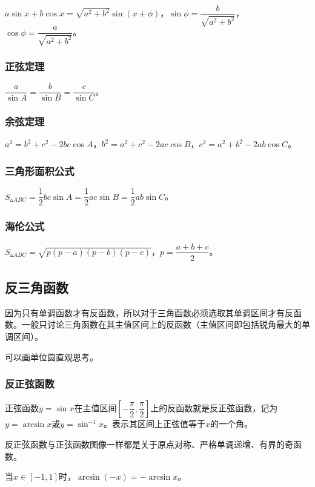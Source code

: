 $a\sin x+b\cos x=\sqrt{a^2+b^2}\sin(x+\phi)$，$\sin\phi=\dfrac{b}{\sqrt{a^2+b^2}}$，$\cos\phi=\dfrac{a}{\sqrt{a^2+b^2}}$。

\subsubsection{正弦定理}

$\dfrac{a}{\sin A}=\dfrac{b}{\sin B}=\dfrac{c}{\sin C}$。

\subsubsection{余弦定理}

$a^2=b^2+c^2-2bc\cos A$，$b^2=a^2+c^2-2ac\cos B$，$c^2=a^2+b^2-2ab\cos C$。

\subsubsection{三角形面积公式}

$S_{\vartriangle ABC}=\dfrac{1}{2}bc\sin A=\dfrac{1}{2}ac\sin B=\dfrac{1}{2}ab\sin C$。

\subsubsection{海伦公式}

$S_{\vartriangle ABC}=\sqrt{p(p-a)(p-b)(p-c)}$，$p=\dfrac{a+b+c}{2}$。

\subsection{反三角函数}

因为只有单调函数才有反函数，所以对于三角函数必须选取其单调区间才有反函数。一般只讨论三角函数在其主值区间上的反函数（主值区间即包括锐角最大的单调区间）。

可以画单位圆直观思考。

\subsubsection{反正弦函数}

正弦函数$y=\sin x$在主值区间$\left[-\dfrac{\pi}{2},\dfrac{\pi}{2}\right]$上的反函数就是反正弦函数，记为$y=\arcsin x$或$y=\sin^{-1}x$。表示其区间上正弦值等于$x$的一个角。

反正弦函数与正弦函数图像一样都是关于原点对称、严格单调递增、有界的奇函数。

当$x\in[-1,1]$时，$\arcsin(-x)=-\arcsin x$。

